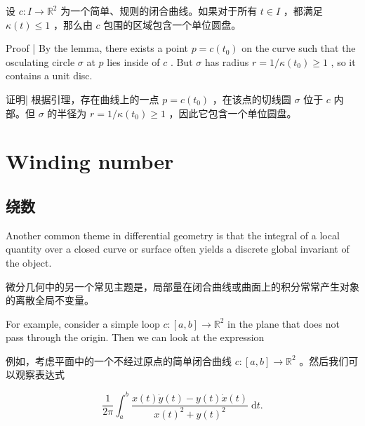 \begin{tcolorbox}
设 \(c : I \rightarrow  {\mathbb{R}}^{2}\) 为一个简单、规则的闭合曲线。如果对于所有 \(t \in  I\) ，都满足 \(\kappa \left( t\right)  \leq  1\) ，那么由 \(c\) 包围的区域包含一个单位圆盘。
\end{tcolorbox}

Proof | By the lemma, there exists a point \(p = c\left( {t}_{0}\right)\) on the curve such that the osculating circle \(\sigma\) at \(p\) lies inside of \(c\) . But \(\sigma\) has radius \(r = 1/\kappa \left( {t}_{0}\right)  \geq  1\) , so it contains a unit disc.

\begin{tcolorbox}
证明| 根据引理，存在曲线上的一点 \(p = c\left( {t}_{0}\right)\) ，在该点的切线圆 \(\sigma\) 位于 \(c\) 内部。但 \(\sigma\) 的半径为 \(r = 1/\kappa \left( {t}_{0}\right)  \geq  1\) ，因此它包含一个单位圆盘。
\end{tcolorbox}

\section*{Winding number}

\begin{tcolorbox}
\section*{绕数}
\end{tcolorbox}

Another common theme in differential geometry is that the integral of a local quantity over a closed curve or surface often yields a discrete global invariant of the object.

\begin{tcolorbox}
微分几何中的另一个常见主题是，局部量在闭合曲线或曲面上的积分常常产生对象的离散全局不变量。
\end{tcolorbox}

For example, consider a simple loop \(c : \left\lbrack  {a,b}\right\rbrack   \rightarrow  {\mathbb{R}}^{2}\) in the plane that does not pass through the origin. Then we can look at the expression

\begin{tcolorbox}
例如，考虑平面中的一个不经过原点的简单闭合曲线 \(c : \left\lbrack  {a,b}\right\rbrack   \rightarrow  {\mathbb{R}}^{2}\) 。然后我们可以观察表达式
\end{tcolorbox}

\[
\frac{1}{2\pi }{\int }_{a}^{b}\frac{x\left( t\right) \dot{y}\left( t\right)  - y\left( t\right) \dot{x}\left( t\right) }{x{\left( t\right) }^{2} + y{\left( t\right) }^{2}}\mathrm{\;d}t. \tag{3.1}
\]

